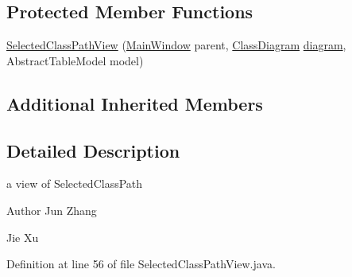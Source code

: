 \subsection*{Protected Member Functions}
\begin{DoxyCompactItemize}
\item 
\hyperlink{classorg_1_1tzi_1_1use_1_1gui_1_1views_1_1selection_1_1classselection_1_1_selected_class_path_view_a4a929053c73f2d605f6a97edc5ec42e7}{Selected\-Class\-Path\-View} (\hyperlink{classorg_1_1tzi_1_1use_1_1gui_1_1main_1_1_main_window}{Main\-Window} parent, \hyperlink{classorg_1_1tzi_1_1use_1_1gui_1_1views_1_1diagrams_1_1classdiagram_1_1_class_diagram}{Class\-Diagram} \hyperlink{classorg_1_1tzi_1_1use_1_1gui_1_1views_1_1selection_1_1_class_selection_view_a8cc2a534904dde3a8f6bebf8c646934d}{diagram}, Abstract\-Table\-Model model)
\end{DoxyCompactItemize}
\subsection*{Additional Inherited Members}


\subsection{Detailed Description}
a view of Selected\-Class\-Path \begin{DoxyAuthor}{Author}
Jun Zhang 

Jie Xu 
\end{DoxyAuthor}


Definition at line 56 of file Selected\-Class\-Path\-View.\-java.



